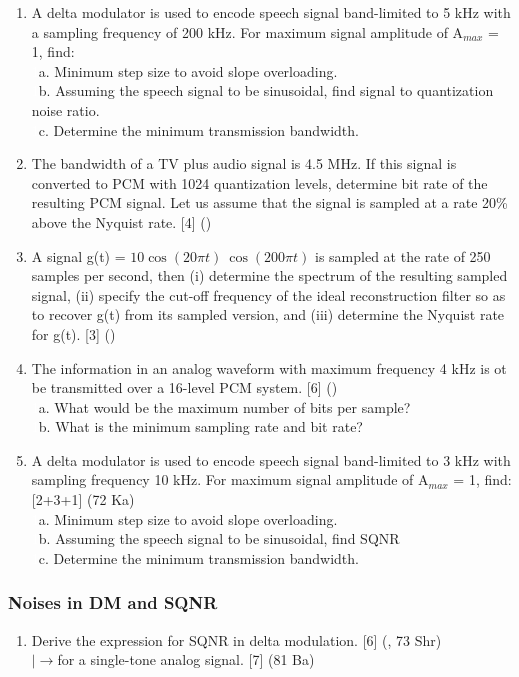 \documentclass[12pt]{article}
\newcommand{\lb}{\\$\left|\rightarrow\right.$}
\newcommand{\enter}{\\\textcolor{white}{1}}
\begin{document}
\begin{enumerate}
        \item A delta modulator is used to encode speech signal band-limited to 5 kHz with a sampling frequency of 200 kHz. For maximum signal amplitude of A$_{max}$ = 1, find:
        \enter a. Minimum step size to avoid slope overloading.
        \enter b. Assuming the speech signal to be sinusoidal, find signal to quantization noise ratio.
        \enter c. Determine the minimum transmission bandwidth.

        \item The bandwidth of a TV plus audio signal is 4.5 MHz. If this signal is converted to PCM with 1024 quantization levels, determine bit rate of the resulting PCM signal. Let us assume that the signal is sampled at a rate 20\% above the Nyquist rate. \hfill [4] ()
        
        \item A signal g(t) = $10 \cos(20\pi t)\ \cos(200\pi t)$ is sampled at the rate of 250 samples per second, then (i) determine the spectrum of the resulting sampled signal, (ii) specify the cut-off frequency of the ideal reconstruction filter so as to recover g(t) from its sampled version, and (iii) determine the Nyquist rate for g(t). \hfill [3] ()
        
        \item The information in an analog waveform with maximum frequency 4 kHz is ot be transmitted over a 16-level PCM system. \hfill [6] ()
        \enter a. What would be the maximum number of bits per sample?
        \enter b. What is the minimum sampling rate and bit rate?
        
       \item A delta modulator is used to encode speech signal band-limited to 3 kHz with sampling frequency 10 kHz. For maximum signal amplitude of A$_{max}$ = 1, find: \hfill [2+3+1] (72 Ka)
       \enter a. Minimum step size to avoid slope overloading.
       \enter b. Assuming the speech signal to be sinusoidal, find SQNR
       \enter c. Determine the minimum transmission bandwidth.
      \end{enumerate}

    \subsubsection{Noises in DM and SQNR}
    	\begin{enumerate}
    		\item Derive the expression for SQNR in delta modulation. \hfill [6] (, 73 Shr)
    		\lb for a single-tone analog signal. \hfill [7] (81 Ba)
    	\end{enumerate}
    	
\end{document}
